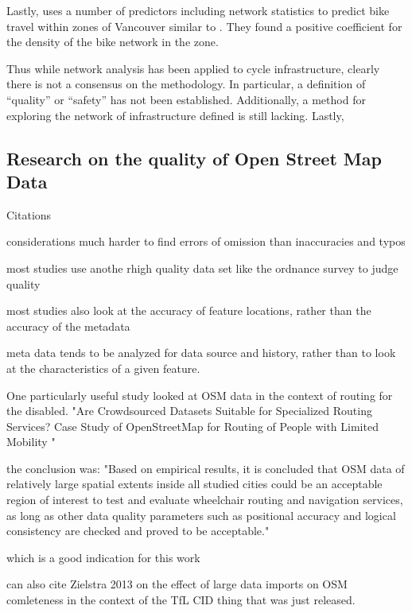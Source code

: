\documentclass[11pt]{article} %
\begin{document}
Lastly, \cite{osama2017models} uses a number of predictors including network statistics to predict bike travel within zones of Vancouver similar to \cite{schoner2014missing}. They found a positive coefficient for the density of the bike network in the zone. 

Thus while network analysis has been applied to cycle infrastructure, clearly there is not a consensus on the methodology. In particular, a definition of ``quality'' or ``safety'' has not been established. Additionally, a method for exploring the network of infrastructure defined is still lacking. Lastly,  

\subsection{Research on the quality of Open Street Map Data}

Citations

considerations
much harder to find errors of omission than inaccuracies and typos

most studies use anothe rhigh quality data set like the ordnance survey to judge quality

most studies also look at the accuracy of feature locations, rather than the accuracy of the metadata

meta data tends to be analyzed for data source and history, rather than to look at the characteristics of a given feature. 

One particularly useful study looked at OSM data in the context of routing for the disabled. "Are Crowdsourced Datasets Suitable for Specialized Routing Services? Case Study of OpenStreetMap for Routing of People with Limited Mobility "

the conclusion was: "Based on empirical results, it is concluded that OSM data of relatively large spatial extents inside all studied cities could be an acceptable region of interest to test and evaluate wheelchair routing and navigation services, as long as other data quality parameters such as positional accuracy and logical consistency are checked and proved to be acceptable."  

which is a good indication for this work 

can also cite Zielstra 2013 on the effect of large data imports on OSM comleteness in the context of the TfL CID thing that was just released. 

\end{document}
